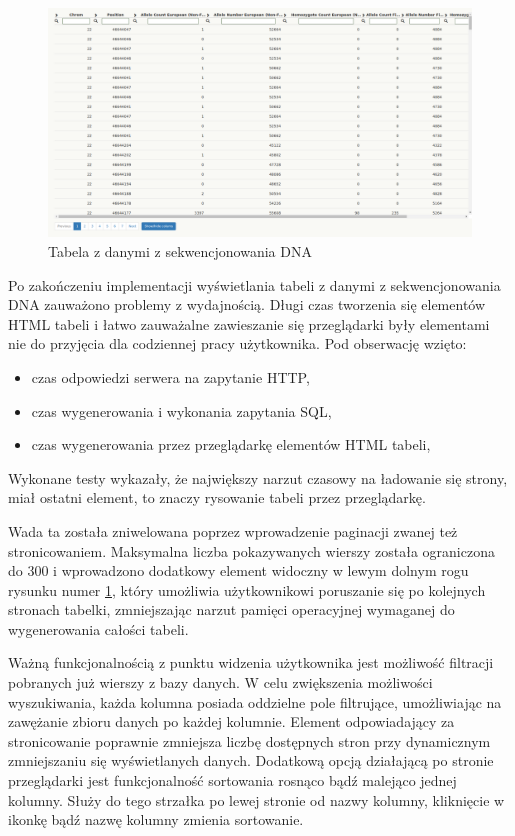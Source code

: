 \documentclass[a4paper,12pt,twoside]{article}
\begin{document}
\begin{figure}[h!]
\includegraphics[width=\linewidth]{obrazy/aplikacja/table1.png}
\caption{Tabela z danymi z sekwencjonowania DNA}
\label{fig:table1pic}
\end{figure}

Po zakończeniu implementacji wyświetlania tabeli z danymi z sekwencjonowania DNA zauważono problemy z wydajnością.
Długi czas tworzenia się elementów HTML tabeli i łatwo zauważalne zawieszanie się przeglądarki
były elementami nie do przyjęcia dla codziennej pracy użytkownika.
Pod obserwację wzięto:
\begin{itemize}
\item czas odpowiedzi serwera na zapytanie HTTP,
\item czas wygenerowania i wykonania zapytania SQL,
\item czas wygenerowania przez przeglądarkę elementów HTML tabeli,
\end{itemize}
Wykonane testy wykazały, że największy narzut czasowy na ładowanie się strony, miał ostatni
element, to znaczy rysowanie tabeli przez przeglądarkę.

Wada ta została zniwelowana poprzez wprowadzenie paginacji zwanej też stronicowaniem.
Maksymalna liczba pokazywanych wierszy została ograniczona do 300 i wprowadzono dodatkowy
element widoczny w lewym dolnym rogu rysunku numer \ref{fig:table1pic}, który umożliwia
użytkownikowi poruszanie się po kolejnych stronach tabelki, zmniejszając narzut
pamięci operacyjnej wymaganej do wygenerowania całości tabeli.
\newline

Ważną funkcjonalnością z punktu widzenia użytkownika jest możliwość filtracji pobranych już wierszy
z bazy danych. W celu zwiększenia możliwości wyszukiwania, każda kolumna posiada oddzielne pole
filtrujące, umożliwiając na zawężanie zbioru danych po każdej kolumnie. Element odpowiadający
za stronicowanie poprawnie zmniejsza liczbę dostępnych stron przy dynamicznym zmniejszaniu się
wyświetlanych danych.
Dodatkową opcją działającą po stronie przeglądarki jest
funkcjonalność sortowania rosnąco bądź malejąco jednej kolumny. Służy do tego strzałka po
lewej stronie od nazwy kolumny, kliknięcie w ikonkę bądź nazwę kolumny zmienia sortowanie.
\end{document}
